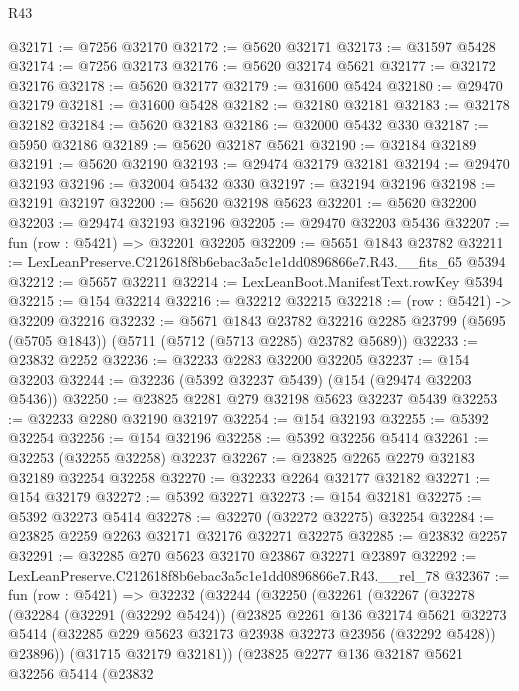 \begin{lexlean}{R43}
\begin{coremodule}
@32171 := @7256 @32170
@32172 := @5620 @32171
@32173 := @31597 @5428
@32174 := @7256 @32173
@32176 := @5620 @32174 @5621
@32177 := @32172 @32176
@32178 := @5620 @32177
@32179 := @31600 @5424
@32180 := @29470 @32179
@32181 := @31600 @5428
@32182 := @32180 @32181
@32183 := @32178 @32182
@32184 := @5620 @32183
@32186 := @32000 @5432 @330
@32187 := @5950 @32186
@32189 := @5620 @32187 @5621
@32190 := @32184 @32189
@32191 := @5620 @32190
@32193 := @29474 @32179 @32181
@32194 := @29470 @32193
@32196 := @32004 @5432 @330
@32197 := @32194 @32196
@32198 := @32191 @32197
@32200 := @5620 @32198 @5623
@32201 := @5620 @32200
@32203 := @29474 @32193 @32196
@32205 := @29470 @32203 @5436
@32207 := fun (row : @5421) => @32201 @32205
@32209 := @5651 @1843 @23782
@32211 := LexLeanPreserve.C212618f8b6ebac3a5c1e1dd0896866e7.R43.__fits_65 @5394
@32212 := @5657 @32211
@32214 := LexLeanBoot.ManifestText.rowKey @5394
@32215 := @154 @32214
@32216 := @32212 @32215
@32218 := (row : @5421) -> @32209 @32216
@32232 := @5671
    @1843
    @23782
    @32216
    @2285
    @23799
    (@5695 (@5705 @1843))
    (@5711 (@5712 (@5713 @2285) @23782 @5689))
@32233 := @23832 @2252
@32236 := @32233 @2283 @32200 @32205
@32237 := @154 @32203
@32244 := @32236 (@5392 @32237 @5439) (@154 (@29474 @32203 @5436))
@32250 := @23825 @2281 @279 @32198 @5623 @32237 @5439
@32253 := @32233 @2280 @32190 @32197
@32254 := @154 @32193
@32255 := @5392 @32254
@32256 := @154 @32196
@32258 := @5392 @32256 @5414
@32261 := @32253 (@32255 @32258) @32237
@32267 := @23825 @2265 @2279 @32183 @32189 @32254 @32258
@32270 := @32233 @2264 @32177 @32182
@32271 := @154 @32179
@32272 := @5392 @32271
@32273 := @154 @32181
@32275 := @5392 @32273 @5414
@32278 := @32270 (@32272 @32275) @32254
@32284 := @23825 @2259 @2263 @32171 @32176 @32271 @32275
@32285 := @23832 @2257
@32291 := @32285 @270 @5623 @32170 @23867 @32271 @23897
@32292 := LexLeanPreserve.C212618f8b6ebac3a5c1e1dd0896866e7.R43.__rel_78
@32367 := fun (row : @5421) =>
  @32232
    (@32244
      (@32250
        (@32261
          (@32267
            (@32278
              (@32284
                (@32291 (@32292 @5424))
                (@23825
                  @2261
                  @136
                  @32174
                  @5621
                  @32273
                  @5414
                  (@32285 @229 @5623 @32173 @23938 @32273 @23956 (@32292 @5428))
                  @23896))
              (@31715 @32179 @32181))
            (@23825
              @2277
              @136
              @32187
              @5621
              @32256
              @5414
              (@23832

\end{coremodule}
\end{lexlean}
